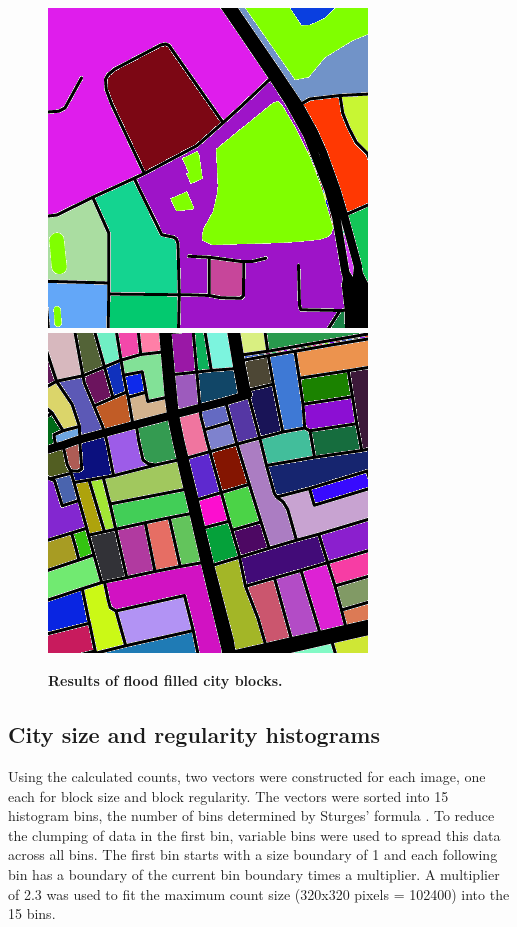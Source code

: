 \documentclass{nature}
\begin{document}
\begin{figure}
    \centering    
\includegraphics[scale=0.3]{Images/city82-745994-result.png}  
\includegraphics[scale=0.3]{Images/city1667-82612-result.png}
\caption{\bf Results of flood filled city blocks.}    
 \label{fig:floodfilled}  
\end{figure} 

\subsection{City size and regularity histograms}\label{methodshist}

Using the calculated counts, two vectors were constructed for each image, one each for block size and block regularity. The vectors were sorted into 15 histogram bins, the number of bins determined by Sturges' formula \cite{Sturges1926}. To reduce the clumping of data in the first bin, variable bins were used to spread this data across all bins. The first bin starts with a size boundary of 1 and each following bin has a boundary of the current bin boundary times a multiplier. A multiplier of 2.3 was used to fit the maximum count size (320x320 pixels = 102400) into the 15 bins.
\end{document}
